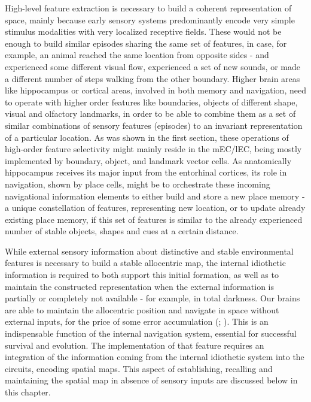 High-level feature extraction is necessary to build a coherent representation of space, mainly because early sensory systems predominantly encode very simple stimulus modalities with very localized receptive fields. These would not be enough to build similar episodes sharing the same set of features, in case, for example, an animal reached the same location from opposite sides - and  experienced some different visual flow, experienced a set of new sounds, or made a different number of steps walking from the other boundary. Higher brain areas like hippocampus or cortical areas, involved in both memory and navigation, need to operate with higher order features like boundaries, objects of different shape, visual and olfactory landmarks, in order to be able to combine them as a set of similar combinations of sensory features (episodes) to an invariant representation of a particular location. As was shown in the first section, these operations of high-order feature selectivity might mainly reside in the mEC/lEC, being mostly implemented by boundary, object, and landmark vector cells. As anatomically hippocampus receives its major input from the entorhinal cortices, its role in navigation, shown by place cells, might be to orchestrate these incoming navigational information elements to either build and store a new place memory - a unique constellation of features, representing new location, or to update already existing place memory, if this set of features is similar to the already experienced number of stable objects, shapes and cues at a certain distance.

While external sensory information about distinctive and stable environmental features is necessary to build a stable allocentric map, the internal idiothetic information is required to both support this initial formation, as well as to maintain the constructed representation when the external information is partially or completely not available - for example, in total darkness. Our brains are able to maintain the allocentric position and navigate in space without external inputs, for the price of some error accumulation (\cite{Etienne1988}; \cite{Etienne2004a}). This is an indispensable function of the internal navigation system, essential for successful survival and evolution. The implementation of that feature requires an integration of the information coming from the internal idiothetic system into the circuits, encoding spatial maps. This aspect of establishing, recalling and maintaining the spatial map in absence of sensory inputs are discussed below in this chapter.


